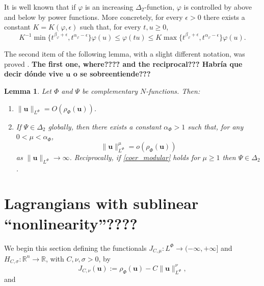 \documentclass[twoside]{article}
\newtheorem{lem}[thm]{Lemma}
\theoremstyle{remark}
\newcommand{\orlnor}{\|_{L^{\Phi}}}
\newcommand{\lphi}{L^{\Phi}}
\renewcommand{\b}[1]{\boldsymbol{#1}}
\newcommand{\rr}{\mathbb{R}}
\renewcommand{\leq}{\leqslant}
\begin{document}
 It is well known   that if $\varphi$ is an increasing $\Delta_2$-function, $\varphi$ is controlled by above and below 
 by power functions.  More concretely, for every $\epsilon>0$ there exists a
constant $K=K(\varphi,\epsilon)$ such that, for every $t,u\geq 0$,
\begin{equation}\label{delta2-potencias}
    K^{-1}\min\big\{t^{\beta_{\varphi}+\epsilon},t^{\alpha_{\varphi}-\epsilon} \big\}\varphi(u)\leq \varphi(t u)\leq
    K\max\big\{t^{\beta_{\varphi}+\epsilon},t^{\alpha_{\varphi}-\epsilon} \big\}\varphi(u).
\end{equation}

The second item of the following lemma, with a slight different notation, was proved \cite{ABGMS2015}.
{\bf The first one, where???? and the reciprocal??? Habr\'ia que decir d\'onde vive ${\b u}$ o se sobreentiende???}


\begin{lem}\label{lem_coer} Let $\Phi$ and $\Psi$ be complementary $N$-functions. Then:
\begin{enumerate}
  \item $\|\b{u}\orlnor=O\left( \rho_{\Phi}\left(\b{u} \right)  \right)$.
  
  \item If $\Psi \in \Delta_2$ globally, then there exists a constant $\alpha_{\Phi}>1$ such that, for any $0<\mu<\alpha_{\Phi}$,
\begin{equation}\label{coer_modular} \|\b{u}\orlnor^{\mu} =o\left(\rho_{\Phi}\left(\b{u}\right)\right)
\end{equation}
as $\|\b{u}\orlnor\to \infty$.
Reciprocally, if \eqref{coer_modular} holds for $\mu\geq 1$ then $\Psi \in \Delta_2$.  
\end{enumerate}
\end{lem}










\section{Lagrangians with sublinear ``nonlinearity''????}
We begin this section  defining the functionals $J_{C,\mu}:\lphi\to (-\infty,+\infty]$ and $  H_{C,\sigma}:\rr^n\to \rr$, with $C,\nu,\sigma>0$, by
\begin{equation}\label{func_phi}
  J_{C,\nu}(\b{u}):= \rho_{\Phi}\left(\b{u}\right)-C\|\b{u}\orlnor^{\nu},
\end{equation}
 and
\end{document}
